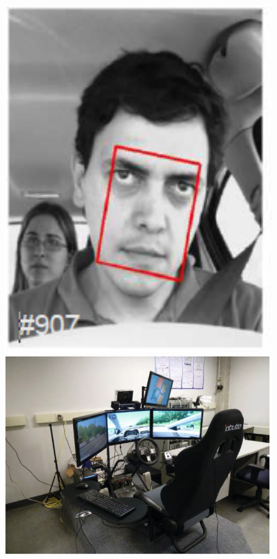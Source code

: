 \documentclass{beamer}
\begin{document}
\begin{frame}
\begin{columns}
\begin{column}{0.25\textwidth}
\begin{center}
					\includegraphics[width=0.9\textwidth]{frontal-view-dataset} \\
					\includegraphics[width=0.9\textwidth]{RanForSim}
				\end{center}
			\end{column}
		\end{columns}
	\end{frame}
	
\end{document}
